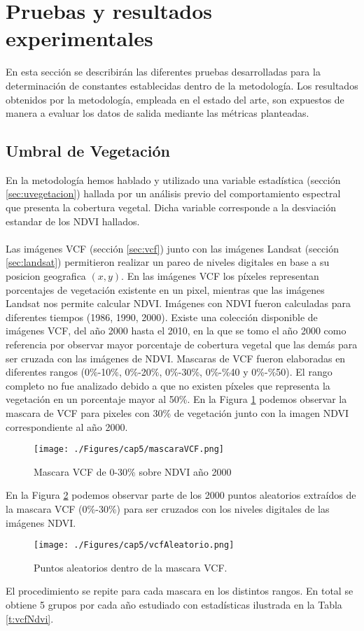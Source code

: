 \section{Pruebas y resultados experimentales}
En esta secci\'on se describir\'an las diferentes pruebas desarrolladas para la determinaci\'on de constantes establecidas dentro de la metodolog\'ia. Los resultados obtenidos por la metodolog\'ia, empleada en el estado del arte, son expuestos de manera a evaluar los datos de salida mediante las m\'etricas planteadas.
\subsection{Umbral de Vegetaci\'on}\label{subsec:umbralVegetacion}
En la metodolog\'ia hemos hablado y utilizado una variable estad\'istica (secci\'on \ref{sec:uvegetacion}) hallada por un an\'alisis previo del comportamiento espectral que presenta la cobertura vegetal. Dicha variable corresponde a la desviaci\'on estandar de los NDVI hallados.\\~\\
Las im\'agenes VCF (secci\'on \ref{sec:vcf}) junto con las im\'agenes Landsat (secci\'on \ref{sec:landsat}) permitieron realizar un pareo de niveles digitales en base a su posicion geografica $ (x,y) $. En las im\'agenes VCF los p\'ixeles representan porcentajes de vegetaci\'on existente en un pixel, mientras que las im\'agenes Landsat nos permite calcular NDVI. Im\'agenes con NDVI fueron calculadas para diferentes tiempos (1986, 1990, 2000). Existe una colecci\'on disponible de im\'agenes VCF, del a\~{n}o 2000 hasta el 2010, en la que se tomo el a\~{n}o 2000 como referencia por observar mayor porcentaje de cobertura vegetal que las dem\'as para ser cruzada con las im\'agenes de NDVI. Mascaras de VCF fueron elaboradas en diferentes rangos (0\%-10\%, 0\%-20\%, 0\%-30\%, 0\%-\%40 y 0\%-\%50). El rango completo no fue analizado debido a que no existen p\'ixeles que representa la vegetaci\'on en un porcentaje mayor al 50\%. En la Figura \ref{fig:mascVCf} podemos observar la mascara de VCF para pixeles con 30\% de vegetaci\'on junto con la imagen NDVI correspondiente al a\~{n}o 2000.
\begin{figure}[H]
	\centering
	\texttt{[image: ./Figures/cap5/mascaraVCF.png]}
	\caption{Mascara VCF de 0-30\% sobre NDVI a\~{n}o 2000}
	\label{fig:mascVCf}
\end{figure}
En la Figura \ref{fig:aleatorioVCf} podemos observar parte de los 2000 puntos aleatorios extra\'idos de la mascara VCF (0\%-30\%) para ser cruzados con los niveles digitales de las im\'agenes NDVI.
\begin{figure}[H]
	\centering
	\texttt{[image: ./Figures/cap5/vcfAleatorio.png]}
	\caption{Puntos aleatorios dentro de la mascara VCF.}
	\label{fig:aleatorioVCf}
\end{figure}
El procedimiento se repite para cada mascara en los distintos rangos. En total se obtiene 5 grupos por cada a\~{n}o estudiado con estad\'isticas ilustrada en la Tabla \ref{t:vcfNdvi}.

